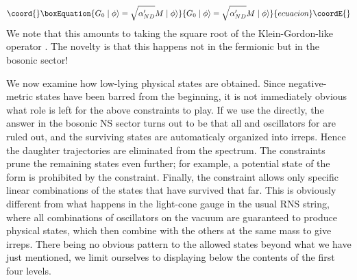 \documentclass[a4paper,a4paper]{article}
\begin{document}
\begin{equation}\coord{}\boxEquation{
G_0 \mid\phi\rangle=\sqrt{ \alpha'_{ND}}M\mid\phi\rangle
}{
G_0 \mid\phi\rangle=\sqrt{ \alpha'_{ND}}M\mid\phi\rangle
}{ecuacion}\coordE{}\end{equation}
We note that this amounts to taking the square root of the
Klein-Gordon-like operator \coordHE{}.  The novelty is that this
happens not in the fermionic but in the bosonic sector!

We now examine how low-lying physical states are obtained.  Since
negative-metric states have been barred from the beginning, it is
not immediately obvious what role is left for the above
constraints to play.  If we use the \coordHE{} directly, the answer in
the bosonic NS sector turns out to be that all \coordHE{}
and \coordHE{} oscillators for \coordHE{} are ruled out, and the
surviving states are automaticaly organized into \coordHE{} irreps.
Hence the daughter trajectories are eliminated from the spectrum.
The \coordHE{} constraints prune the remaining states even further; for
example, a potential \coordHE{} state of the form
\coordHE{} is
prohibited by the \coordHE{} constraint. Finally, the \coordHE{}
constraint allows only specific linear combinations of the states
that have survived that far. This is obviously different from what
happens in the light-cone gauge in the usual RNS string, where all
combinations of \coordHE{}
oscillators on the vacuum are guaranteed to produce physical
states, which then combine with the others at the same mass to
give \coordHE{} irreps.  There being no obvious pattern to the
allowed states beyond what we have just mentioned, we limit
ourselves to displaying below the contents of the first four
levels.
\end{document}
